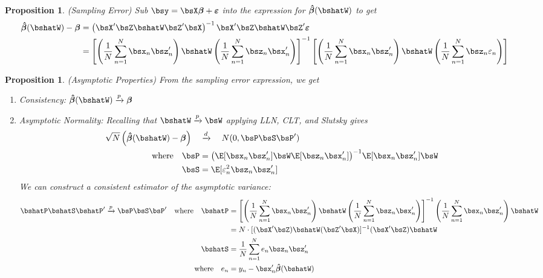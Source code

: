 \documentclass[12pt]{article}
\theoremstyle{plain}
\newtheorem{prop}[thm]{Proposition}
\theoremstyle{definition}
\theoremstyle{remark}
\newcommand{\bsvarepsilon}{\boldsymbol{\varepsilon}}
\newcommand{\bsbeta}{\boldsymbol{\beta}}
\newcommand{\bshatbeta}{\boldsymbol{\hat{\beta}}}
\newcommand{\pto}{\xrightarrow{p}}
\newcommand{\dto}{\xrightarrow{d}}
\newcommand{\sumnN}{\sum^N_{n=1}}
\begin{document}
\begin{prop}\emph{(Sampling Error)}
Sub $\bsy = \bsX\bsbeta +\bsvarepsilon$ into the expression for
$\bshatbeta(\bshatW)$ to get
\begin{align*}
  \bshatbeta(\bshatW) - \bsbeta
  &=
  \left(\bsX'\bsZ\bshatW
  \bsZ'\bsX\right)^{-1}\bsX'\bsZ\bshatW\bsZ'\bsvarepsilon \\
  &=
  \left[
    \left(\frac{1}{N} \sumnN \bsx_n \bsz_n'\right)
    \bshatW
    \left(\frac{1}{N} \sumnN \bsz_n\bsx_n' \right)
  \right]^{-1}
  \left[
    \left(\frac{1}{N} \sumnN \bsx_n \bsz_n'\right)
    \bshatW
    \left(\frac{1}{N} \sumnN \bsz_n \varepsilon_n \right)
  \right]
\end{align*}
\end{prop}


\begin{prop}\emph{(Asymptotic Properties)}
\label{prop:gmmasymptoticsmultiple}
From the sampling error expression, we get
\begin{enumerate}[label=(\roman*)]
  \item Consistency: $\bshatbeta(\bshatW)\pto \bsbeta$
  \item Asymptotic Normality: Recalling that $\bshatW\pto \bsW$
    applying LLN, CLT, and Slutsky gives
    \begin{align*}
      \sqrt{N}\left(\bshatbeta(\bshatW) - \bsbeta\right)
      \quad &\dto \quad
      N(0,\bsP\bsS\bsP') \\
      \text{where}\quad
      \bsP &=
      \big(
        \E[\bsx_n\bsz_n']
        \bsW
        \E[\bsz_n\bsx_n']
      \big)^{-1}
      \E[\bsx_n\bsz_n']
      \bsW
      \\
      \bsS &=
        \E[\varepsilon_n^2 \bsz_n\bsz_n']
    \end{align*}
    We can construct a consistent estimator of the asymptotic variance:
    \begin{align*}
      \bshatP\bshatS\bshatP' \pto \bsP\bsS\bsP'
      \quad\text{where}\quad
      \bshatP &=
      \left[
      \left(
      \frac{1}{N}
        \sumnN \bsx_n\bsz_n'
      \right)
      \bshatW
      \left(
      \frac{1}{N}
        \sumnN \bsz_n\bsx_n'
      \right)
      \right]^{-1}
      \left(
      \frac{1}{N}
        \sumnN \bsx_n\bsz_n'
      \right)
      \bshatW \\
      &= N \cdot [(\bsX'\bsZ)\bshatW(\bsZ'\bsX)]^{-1}(\bsX'\bsZ)\bshatW
      \\
      \bshatS &=
      \frac{1}{N}\sumnN e_n \bsz_n\bsz_n' \\
      \text{where}\quad
      e_n &= y_n - \bsx_n'\bshatbeta(\bshatW)
    \end{align*}
\end{enumerate}
\end{prop}
\end{document}
